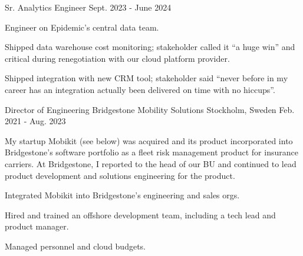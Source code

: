 \begin{cventries}
  \vspace{-1.0mm}
  \cventry
    {Sr. Analytics Engineer} %
    {} %
    {} %
    {Sept. 2023 - June 2024} %
    {
    Engineer on Epidemic's central data team.
    \vspace{5.0mm}
      \begin{cvitems} %
        \item {Shipped data warehouse cost monitoring; stakeholder called it “a huge win” and critical during renegotiation with our cloud platform provider.}
        \item {Shipped integration with new CRM tool; stakeholder said “never before in my career has an integration actually been delivered on time with no hiccups”.}
      \end{cvitems}
    }
  \vspace{3.0mm}

  \cventry
    {Director of Engineering} %
    {Bridgestone Mobility Solutions} %
    {Stockholm, Sweden} %
    {Feb. 2021 - Aug. 2023} %
    {
      My startup Mobikit (see below) was acquired and its product incorporated into Bridgestone's software portfolio as a fleet risk management product for insurance carriers. At Bridgestone, I reported to the head of our BU and continued to lead product development and solutions engineering for the product.
      \vspace{5.0mm}
      \begin{cvitems} %
        \item {Integrated Mobikit into Bridgestone's engineering and sales orgs.}
        \item {Hired and trained an offshore development team, including a tech lead and product manager.}
        \item {Managed personnel and cloud budgets.}
      \end{cvitems}
    }
    \vspace{3.0mm}


\end{cventries}
